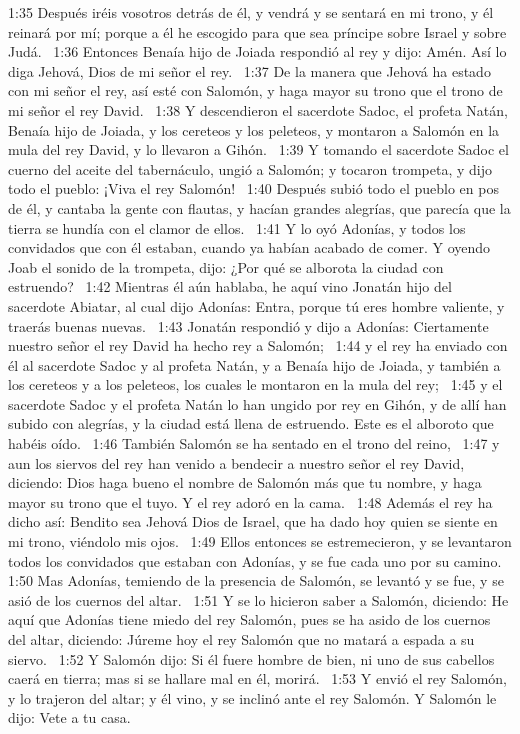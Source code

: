 1:35 Después iréis vosotros detrás de él, y vendrá y se sentará en mi trono, y él reinará por mí; porque a él he escogido para que sea príncipe sobre Israel y sobre Judá.  
1:36 Entonces Benaía hijo de Joiada respondió al rey y dijo: Amén. Así lo diga Jehová, Dios de mi señor el rey.  
1:37 De la manera que Jehová ha estado con mi señor el rey, así esté con Salomón, y haga mayor su trono que el trono de mi señor el rey David.  
1:38 Y descendieron el sacerdote Sadoc, el profeta Natán, Benaía hijo de Joiada, y los cereteos y los peleteos, y montaron a Salomón en la mula del rey David, y lo llevaron a Gihón.  
1:39 Y tomando el sacerdote Sadoc el cuerno del aceite del tabernáculo, ungió a Salomón; y tocaron trompeta, y dijo todo el pueblo: ¡Viva el rey Salomón!  
1:40 Después subió todo el pueblo en pos de él, y cantaba la gente con flautas, y hacían grandes alegrías, que parecía que la tierra se hundía con el clamor de ellos.  
1:41 Y lo oyó Adonías, y todos los convidados que con él estaban, cuando ya habían acabado de comer. Y oyendo Joab el sonido de la trompeta, dijo: ¿Por qué se alborota la ciudad con estruendo?  
1:42 Mientras él aún hablaba, he aquí vino Jonatán hijo del sacerdote Abiatar, al cual dijo Adonías: Entra, porque tú eres hombre valiente, y traerás buenas nuevas.  
1:43 Jonatán respondió y dijo a Adonías: Ciertamente nuestro señor el rey David ha hecho rey a Salomón;  
1:44 y el rey ha enviado con él al sacerdote Sadoc y al profeta Natán, y a Benaía hijo de Joiada, y también a los cereteos y a los peleteos, los cuales le montaron en la mula del rey;  
1:45 y el sacerdote Sadoc y el profeta Natán lo han ungido por rey en Gihón, y de allí han subido con alegrías, y la ciudad está llena de estruendo. Este es el alboroto que habéis oído.  
1:46 También Salomón se ha sentado en el trono del reino,  
1:47 y aun los siervos del rey han venido a bendecir a nuestro señor el rey David, diciendo: Dios haga bueno el nombre de Salomón más que tu nombre, y haga mayor su trono que el tuyo. Y el rey adoró en la cama.  
1:48 Además el rey ha dicho así: Bendito sea Jehová Dios de Israel, que ha dado hoy quien se siente en mi trono, viéndolo mis ojos.  
1:49 Ellos entonces se estremecieron, y se levantaron todos los convidados que estaban con Adonías, y se fue cada uno por su camino.  
1:50 Mas Adonías, temiendo de la presencia de Salomón, se levantó y se fue, y se asió de los cuernos del altar.  
1:51 Y se lo hicieron saber a Salomón, diciendo: He aquí que Adonías tiene miedo del rey Salomón, pues se ha asido de los cuernos del altar, diciendo: Júreme hoy el rey Salomón que no matará a espada a su siervo.  
1:52 Y Salomón dijo: Si él fuere hombre de bien, ni uno de sus cabellos caerá en tierra; mas si se hallare mal en él, morirá.  
1:53 Y envió el rey Salomón, y lo trajeron del altar; y él vino, y se inclinó ante el rey Salomón. Y Salomón le dijo: Vete a tu casa.  

